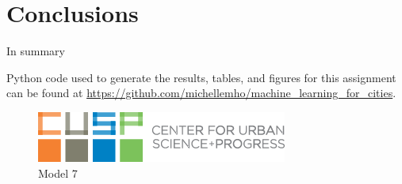\documentclass[10pt,twocolumn]{article}
\begin{document}
\section{Conclusions}

In summary

Python code used to generate the results, tables, and figures for this assignment can be
found at \url{https://github.com/michellemho/machine_learning_for_cities}.


\begin{figure}[!t]
  \begin{center}
    \includegraphics[width=\textwidth,height=\textheight,keepaspectratio]{cusp-index.png}
  \end{center}

  \caption{\small Model 7}
  \label{fig-1}
\end{figure}
\end{document}
